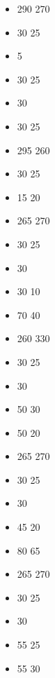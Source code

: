 %
\begin{multicols}{2}
	\begin{itemize}
		\subsubtitle{\beastgiant}
		\item \basecost{} 290 \costdown{} 270
		\item \bigbrother{} 30 \costdown{} 25
		\item \uprootedtree{} 5 \costdown{} \free
		\item \beerbarrel{} 30 \costdown{} 25
		\item \fame{} 30 \costdown{} \free
		\item \giantclub{} 30 \costdown{} 25
		\item \basecost{} 295 \costdown{} 260
		\item \bigbrother{} 30 \costdown{} 25
		\item \dexteroustentacles{} 15 \costup{} 20
		\subsubtitle{\dreadedgiant}
		\item \basecost{} 265 \costup{} 270
		\item \bigbrother{} 30 \costdown{} 25
		\item \giantclub{} 30 \costdown{} \free
		\item \monstrouswhip{} 30 \costdown{} 10
		\item \dreadmask{} 70 \costdown{} 40
		\subsubtitle{\giantdwarf}
		\item \basecost{} 260 \costup{} 330
		\item \bigbrother{} 30 \costdown{} 25
		\item \giantclub{} 30 \costdown{} \free
		\item \giantofthedeep{} 50 \costdown{} 30
		\item \giantseeker{} 50 \costdown{} 20
		\subsubtitle{\imperialgiant}
		\item \basecost{} 265 \costup{} 270
		\item \bigbrother{} 30 \costdown{} 25
		\item \giantclub{} 30 \costdown{} \free
		\item \bigfanofsunna{} 45 \costdown{} 20
		\item \giantrepeater{} 80 \costdown{} 65
		\subsubtitle{\highborngiant}
		\item \basecost{} 265 \costup{} 270
		\item \bigbrother{} 30 \costdown{} 25
		\item \giantclub{} 30 \costdown{} \free
		\item \lioncloakandaxe{} 55 \costdown{} 25
		\item \shoreguardianbow{} 55 \costdown{} 30

\end{itemize}
\end{multicols}
